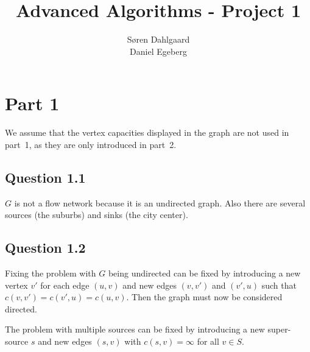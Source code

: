 \documentclass{sig-alternate}
\begin{document}
\title{Advanced Algorithms - Project 1}


\author{
\alignauthor
Søren Dahlgaard\\
\alignauthor
Daniel Egeberg\\
}

\maketitle

\section{Part 1}
We assume that the vertex capacities displayed in the graph are not used in
part~1, as they are only introduced in part~2.

\subsection*{Question 1.1}

$G$ is not a flow network because it is an undirected graph. Also there are
several sources (the suburbs) and sinks (the city center).


\subsection*{Question 1.2}

Fixing the problem with $G$ being undirected can be fixed by introducing a
new vertex $v'$ for each edge $(u,v)$ and new edges $(v,v')$ and $(v',u)$
such that $c(v, v') = c(v', u) = c(u, v)$. Then the graph must now be
considered directed.

The problem with multiple sources can be fixed by introducing a new
super-source $s$ and new edges $(s, v)$ with $c(s, v)=\infty$ for all $v \in
S$.
\end{document}
